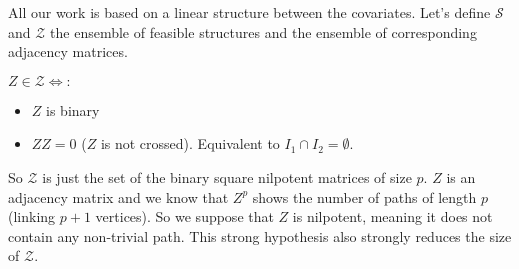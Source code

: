 \documentclass[11pt,a4paper]{article}
\begin{document}
  All our work is based on a linear structure between the covariates.
	Let's define $\mathcal{S}$ and $\mathcal{Z}$ the ensemble of feasible structures and the ensemble of corresponding adjacency matrices.

	$Z \in \mathcal{Z} \Leftrightarrow : $
	\begin{itemize}
		\item $Z$ is binary
		\item $Z Z=0 $ ($Z$ is not crossed). Equivalent to $I_1\cap I_2 =\emptyset$.
	\end{itemize}

	So  $\mathcal{Z}$ is just the set of the binary square nilpotent matrices of size $p$. $Z$ is an adjacency matrix and we know \cite{biggs1993algebraic} that $Z^p$ shows the number of paths of length $p$ (linking $p+1$ vertices). So we suppose that $Z$ is nilpotent, meaning it does not contain any non-trivial path. This strong hypothesis also strongly reduces the size of $\mathcal{Z}$. 	
\end{document}

